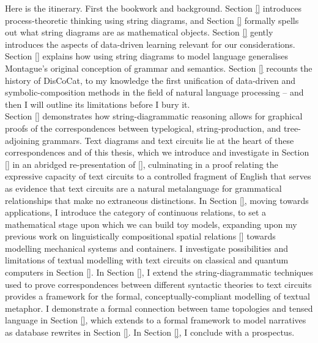 Here is the itinerary. First the bookwork and background. Section \ref{} introduces process-theoretic thinking using string diagrams, and Section \ref{} formally spells out what string diagrams are as mathematical objects. Section \ref{} gently introduces the aspects of data-driven learning relevant for our considerations. Section \ref{} explains how using string diagrams to model language generalises Montague's original conception of grammar and semantics. Section \ref{} recounts the history of DisCoCat, to my knowledge the first unification of data-driven and symbolic-composition methods in the field of natural language processing -- and then I will outline its limitations before I bury it.\\

 Section \ref{} demonstrates how string-diagrammatic reasoning allows for graphical proofs of the correspondences between typelogical, string-production, and tree-adjoining grammars. Text diagrams and text circuits lie at the heart of these correspondences and of this thesis, which we introduce and investigate in Section \ref{} in an abridged re-presentation of [], culminating in a proof relating the expressive capacity of text circuits to a controlled fragment of English that serves as evidence that text circuits are a natural metalanguage for grammatical relationships that make no extraneous distinctions. In Section \ref{}, moving towards applications, I introduce the category of continuous relations, to set a mathematical stage upon which we can build toy models, expanding upon my previous work on linguistically compositional spatial relations [] towards modelling mechanical systems and containers. I investigate possibilities and limitations of textual modelling with text circuits on classical and quantum computers in Section \ref{}. In Section \ref{}, I extend the string-diagrammatic techniques used to prove correspondences between different syntactic theories to text circuits provides a framework for the formal, conceptually-compliant modelling of textual metaphor. I demonstrate a formal connection between tame topologies and tensed language in Section \ref{}, which extends to a formal framework to model narratives as database rewrites in Section \ref{}. In Section \ref{}, I conclude with a prospectus.
